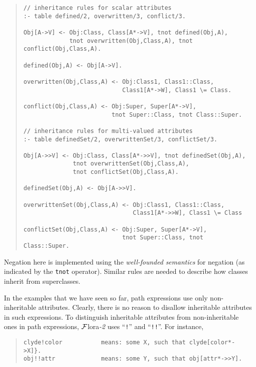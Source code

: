 \documentclass[11pt]{article}
\newcommand{\FLORA}{{\mbox{${\cal F}${\sc lora}\rm\emph{-2}}}\xspace}
\begin{document}
\begin{quote}
\begin{verbatim}
// inheritance rules for scalar attributes
:- table defined/2, overwritten/3, conflict/3.

Obj[A->V] <- Obj:Class, Class[A*->V], tnot defined(Obj,A),
             tnot overwritten(Obj,Class,A), tnot conflict(Obj,Class,A).

defined(Obj,A) <- Obj[A->V].

overwritten(Obj,Class,A) <- Obj:Class1, Class1::Class,
                            Class1[A*->W], Class1 \= Class.

conflict(Obj,Class,A) <- Obj:Super, Super[A*->V],
                         tnot Super::Class, tnot Class::Super.

// inheritance rules for multi-valued attributes
:- table definedSet/2, overwrittenSet/3, conflictSet/3.

Obj[A->>V] <- Obj:Class, Class[A*->>V], tnot definedSet(Obj,A),
              tnot overwrittenSet(Obj,Class,A),
              tnot conflictSet(Obj,Class,A).

definedSet(Obj,A) <- Obj[A->>V].

overwrittenSet(Obj,Class,A) <- Obj:Class1, Class1::Class,
                               Class1[A*->>W], Class1 \= Class

conflictSet(Obj,Class,A) <- Obj:Super, Super[A*->V],
                            tnot Super::Class, tnot Class::Super.
\end{verbatim}
\end{quote}
Negation here is implemented using the {\em well-founded semantics}
for negation \cite{gelder-alternating-89,gelder-ross-schlipf-91} (as
indicated by the {\tt tnot} operator).  Similar rules are needed to
describe how classes inherit from superclasses.

In the examples that we have seen so far, path expressions use only
non-inheritable attributes. Clearly, there is no reason to disallow
inheritable attributes in such expressions. To distinguish inheritable
attributes from non-inheritable ones in path expressions, \FLORA uses
``{\tt !}'' and ``{\tt !!}''. For instance,
\begin{quote}
\begin{verbatim}
clyde!color           means: some X, such that clyde[color*->X]}.
obj!!attr             means: some Y, such that obj[attr*->>Y].
\end{verbatim}
\end{quote}
\end{document}
